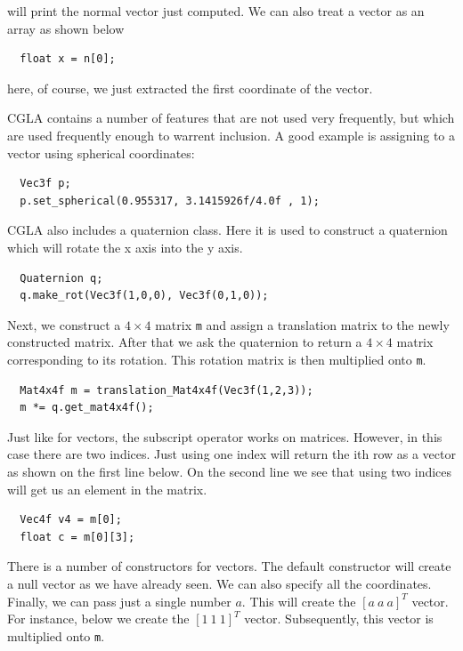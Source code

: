 \documentclass[a4paper]{article}
\begin{document}
will print the normal vector just computed. We can also treat a vector
as an array as shown below

\begin{verbatim}
  float x = n[0];
\end{verbatim}

here, of course, we just extracted the first coordinate of the
vector. 

CGLA contains a number of features that are not used very frequently,
but which are used frequently enough to warrent inclusion. A good
example is assigning to a vector using spherical coordinates:

\begin{verbatim}
  Vec3f p;
  p.set_spherical(0.955317, 3.1415926f/4.0f , 1);
\end{verbatim}

CGLA also includes a quaternion class. Here it is used to construct a
quaternion which will rotate the x axis into the y axis.

\begin{verbatim}
  Quaternion q;
  q.make_rot(Vec3f(1,0,0), Vec3f(0,1,0));
\end{verbatim}

Next, we construct a $4\times 4$ matrix \texttt{m} and assign a translation
matrix to the newly constructed matrix. After that we ask the
quaternion to return a $4\times 4$ matrix corresponding to its
rotation. This rotation matrix is then multiplied onto \texttt{m}.

\begin{verbatim} 
  Mat4x4f m = translation_Mat4x4f(Vec3f(1,2,3));
  m *= q.get_mat4x4f();
\end{verbatim}

Just like for vectors, the subscript operator works on
matrices. However, in this case there are two indices. Just using one
index will return the ith row as a vector as shown on the first line
below. On the second line we see that using two indices will get us an
element in the matrix. 

\begin{verbatim} 
  Vec4f v4 = m[0];
  float c = m[0][3];
\end{verbatim}

There is a number of constructors for vectors. The default constructor
will create a null vector as we have already seen. We can also specify
all the coordinates. Finally, we can pass just a single number
$a$. This will create the $[a\:a\:a]^T$ vector. For instance, below we
create the $[1\: 1\: 1]^T$ vector. Subsequently, this vector is
multiplied onto \texttt{m}. 
\end{document}
